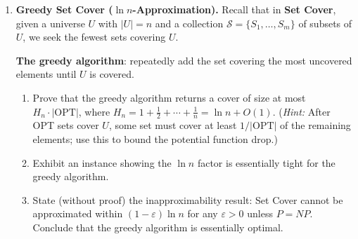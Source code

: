 \documentclass[9pt]{book}
\begin{document}
\begin{enumerate}[label=\arabic*.]
\bigskip

\item \textbf{Greedy Set Cover ($\ln n$-Approximation).}
Recall that in \textbf{Set Cover}, given a universe $U$ with $|U|=n$ and a collection
$\mathcal{S}=\{S_1,\ldots,S_m\}$ of subsets of $U$, we seek the fewest sets covering $U$.

{\bf The greedy algorithm}: repeatedly add the set covering the most uncovered
        elements until $U$ is covered.
  
\begin{enumerate}[label=(\alph*)]
  \item Prove that the greedy algorithm returns a cover of size at most
        $H_n\cdot|\mathrm{OPT}|$, where $H_n=1+\tfrac{1}{2}+\cdots+\tfrac{1}{n}=\ln n+O(1)$.
        (\textit{Hint:} After OPT sets cover $U$, some set must cover at least $1/|\mathrm{OPT}|$
        of the remaining elements; use this to bound the potential function drop.)
  \item Exhibit an instance showing the $\ln n$ factor is essentially tight for the greedy
        algorithm.
  \item State (without proof) the inapproximability result: Set Cover cannot be approximated
        within $(1-\varepsilon)\ln n$ for any $\varepsilon>0$ unless $P=NP$.
        Conclude that the greedy algorithm is essentially optimal.
\end{enumerate}

\bigskip



\end{enumerate}
\end{document}

